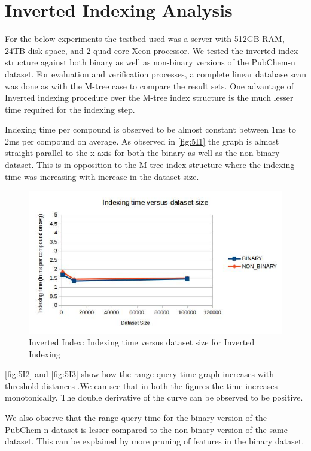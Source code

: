 \section{Inverted Indexing Analysis}

For the below experiments the testbed used was a server with 512GB RAM, 24TB disk space, and 2 quad core Xeon processor. We tested the inverted index structure against both binary as well as non-binary versions of the PubChem-n dataset. For evaluation and verification processes, a complete linear database scan was done as with the M-tree case to compare the result sets. One advantage of Inverted indexing procedure over the M-tree index structure is the much lesser time required for the indexing step. 

Indexing time per compound is observed to be almost constant between 1ms to 2ms per compound on average. As observed in \autoref{fig:5I1} the graph is almost straight parallel to the x-axis for both the binary as well as the non-binary dataset. This is in opposition to the M-tree index structure where the indexing time was increasing with increase in the dataset size. 


\begin{figure}[ht]	
\centering
\includegraphics[width=1 \columnwidth]{img/imageI1.jpg}
\caption{Inverted Index: Indexing time versus dataset size for Inverted Indexing}
\label{fig:5I1}
\end{figure}


\autoref{fig:5I2} and \autoref{fig:5I3} show how the range query time graph increases with threshold distances .We can see that in both the figures the time increases monotonically. The double derivative of the curve can be observed to be positive. 

We also observe that the range query time for the binary version of the PubChem-n dataset is lesser compared to the non-binary version of the same dataset. This can be explained by more pruning of features in the binary dataset.

